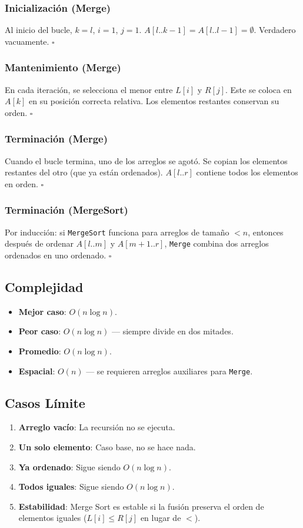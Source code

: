 \documentclass[11pt,a4paper]{article}
\begin{document}
\subsubsection{Inicialización (Merge)}
Al inicio del bucle, $k = l$, $i = 1$, $j = 1$. $A[l..k-1] = A[l..l-1] = \emptyset$. Verdadero vacuamente. $\square$

\subsubsection{Mantenimiento (Merge)}
En cada iteración, se selecciona el menor entre $L[i]$ y $R[j]$. Este se coloca en $A[k]$ en su posición correcta relativa. Los elementos restantes conservan su orden. $\square$

\subsubsection{Terminación (Merge)}
Cuando el bucle termina, uno de los arreglos se agotó. Se copian los elementos restantes del otro (que ya están ordenados). $A[l..r]$ contiene todos los elementos en orden. $\square$

\subsubsection{Terminación (MergeSort)}
Por inducción: si \texttt{MergeSort} funciona para arreglos de tamaño $< n$, entonces después de ordenar $A[l..m]$ y $A[m+1..r]$, \texttt{Merge} combina dos arreglos ordenados en uno ordenado. $\square$

\subsection{Complejidad}
\begin{itemize}
    \item \textbf{Mejor caso}: $O(n \log n)$.
    \item \textbf{Peor caso}: $O(n \log n)$ --- siempre divide en dos mitades.
    \item \textbf{Promedio}: $O(n \log n)$.
    \item \textbf{Espacial}: $O(n)$ --- se requieren arreglos auxiliares para \texttt{Merge}.
\end{itemize}

\subsection{Casos Límite}
\begin{enumerate}
    \item \textbf{Arreglo vacío}: La recursión no se ejecuta.
    \item \textbf{Un solo elemento}: Caso base, no se hace nada.
    \item \textbf{Ya ordenado}: Sigue siendo $O(n \log n)$.
    \item \textbf{Todos iguales}: Sigue siendo $O(n \log n)$.
    \item \textbf{Estabilidad}: Merge Sort es estable si la fusión preserva el orden de elementos iguales ($L[i] \leq R[j]$ en lugar de $<$).
\end{enumerate}
\end{document}
